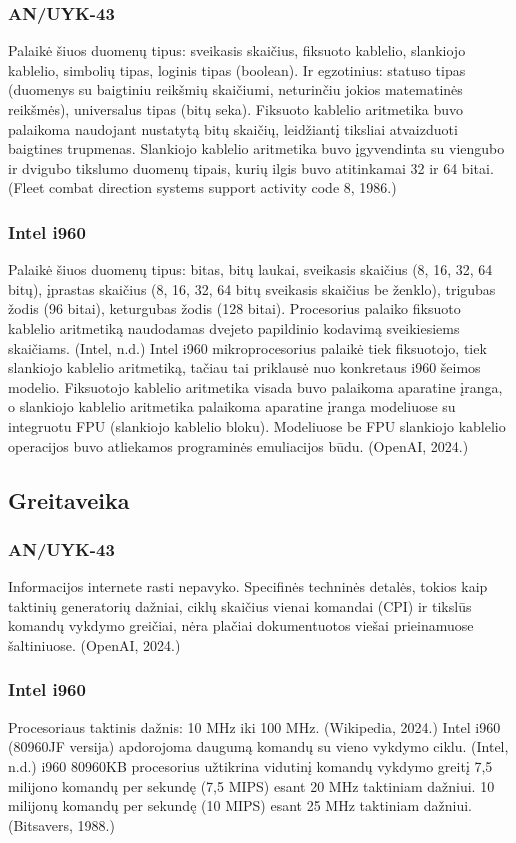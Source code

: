 \documentclass{article}
\begin{document}
\subsubsection{AN/UYK-43}
Palaikė šiuos duomenų tipus: sveikasis skaičius, fiksuoto kablelio, slankiojo kablelio, simbolių tipas, loginis tipas (boolean). Ir egzotinius: statuso tipas (duomenys su baigtiniu reikšmių skaičiumi, neturinčiu jokios matematinės reikšmės), universalus tipas (bitų seka). Fiksuoto kablelio aritmetika buvo palaikoma naudojant nustatytą bitų skaičių, leidžiantį tiksliai atvaizduoti baigtines trupmenas. Slankiojo kablelio aritmetika buvo įgyvendinta su viengubo ir dvigubo tikslumo duomenų tipais, kurių ilgis buvo atitinkamai 32 ir 64 bitai. (Fleet combat direction systems support activity code 8, 1986.)
\subsubsection{Intel i960}
Palaikė šiuos duomenų tipus: bitas, bitų laukai, sveikasis skaičius (8, 16, 32, 64 bitų), įprastas skaičius (8, 16, 32, 64 bitų sveikasis skaičius be ženklo), trigubas žodis (96 bitai), keturgubas žodis (128 bitai). Procesorius palaiko fiksuoto kablelio aritmetiką naudodamas dvejeto papildinio kodavimą sveikiesiems skaičiams. (Intel, n.d.) Intel i960 mikroprocesorius palaikė tiek fiksuotojo, tiek slankiojo kablelio aritmetiką, tačiau tai priklausė nuo konkretaus i960 šeimos modelio. Fiksuotojo kablelio aritmetika visada buvo palaikoma aparatine įranga, o slankiojo kablelio aritmetika palaikoma aparatine įranga modeliuose su integruotu FPU (slankiojo kablelio bloku). Modeliuose be FPU slankiojo kablelio operacijos buvo atliekamos programinės emuliacijos būdu. (OpenAI, 2024.)
\subsection{Greitaveika}
\subsubsection{AN/UYK-43}
Informacijos internete rasti nepavyko. Specifinės techninės detalės, tokios kaip taktinių generatorių dažniai, ciklų skaičius vienai komandai (CPI) ir tikslūs komandų vykdymo greičiai, nėra plačiai dokumentuotos viešai prieinamuose šaltiniuose. (OpenAI, 2024.)
\subsubsection{Intel i960}
Procesoriaus taktinis dažnis: 10 MHz iki 100 MHz. (Wikipedia, 2024.) Intel i960 (80960JF versija) apdorojoma daugumą komandų su vieno vykdymo ciklu. (Intel, n.d.) i960 80960KB procesorius užtikrina vidutinį komandų vykdymo greitį 7,5 milijono komandų per sekundę (7,5 MIPS) esant 20 MHz taktiniam dažniui. 10 milijonų komandų per sekundę (10 MIPS) esant 25 MHz taktiniam dažniui. (Bitsavers, 1988.)
\end{document}

